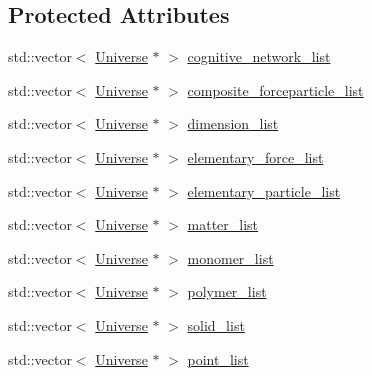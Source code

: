 \subsection*{Protected Attributes}
\begin{DoxyCompactItemize}
\item 
std\+::vector$<$ \mbox{\hyperlink{classUniverse}{Universe}} $\ast$ $>$ \mbox{\hyperlink{classUniverse_a7a0e9796ff0d650a8b1fbde5fa5b761f}{cognitive\+\_\+network\+\_\+list}}
\item 
std\+::vector$<$ \mbox{\hyperlink{classUniverse}{Universe}} $\ast$ $>$ \mbox{\hyperlink{classUniverse_ae9795d06e406c4322637825aa545aa2f}{composite\+\_\+forceparticle\+\_\+list}}
\item 
std\+::vector$<$ \mbox{\hyperlink{classUniverse}{Universe}} $\ast$ $>$ \mbox{\hyperlink{classUniverse_a159461f7098c3a30274f54c8acff6eac}{dimension\+\_\+list}}
\item 
std\+::vector$<$ \mbox{\hyperlink{classUniverse}{Universe}} $\ast$ $>$ \mbox{\hyperlink{classUniverse_a015b19f6d5ad84ebaa9e3e7c8352389c}{elementary\+\_\+force\+\_\+list}}
\item 
std\+::vector$<$ \mbox{\hyperlink{classUniverse}{Universe}} $\ast$ $>$ \mbox{\hyperlink{classUniverse_aeb2e63cf49f0b5595e6c15109863bd3b}{elementary\+\_\+particle\+\_\+list}}
\item 
std\+::vector$<$ \mbox{\hyperlink{classUniverse}{Universe}} $\ast$ $>$ \mbox{\hyperlink{classUniverse_a409650bc0425fc22c7713487a2a6dd8e}{matter\+\_\+list}}
\item 
std\+::vector$<$ \mbox{\hyperlink{classUniverse}{Universe}} $\ast$ $>$ \mbox{\hyperlink{classUniverse_a3d55ba29f95a9793b69c01f7942eca9f}{monomer\+\_\+list}}
\item 
std\+::vector$<$ \mbox{\hyperlink{classUniverse}{Universe}} $\ast$ $>$ \mbox{\hyperlink{classUniverse_a4d898757f2d67ca5ab5d504388d6199a}{polymer\+\_\+list}}
\item 
std\+::vector$<$ \mbox{\hyperlink{classUniverse}{Universe}} $\ast$ $>$ \mbox{\hyperlink{classUniverse_a747f9d3cf0b2caada4461cb7b12ea17b}{solid\+\_\+list}}
\item 
std\+::vector$<$ \mbox{\hyperlink{classUniverse}{Universe}} $\ast$ $>$ \mbox{\hyperlink{classUniverse_a9dc8abd2f8f84318722184f38e1b8cc7}{point\+\_\+list}}
\end{DoxyCompactItemize}
